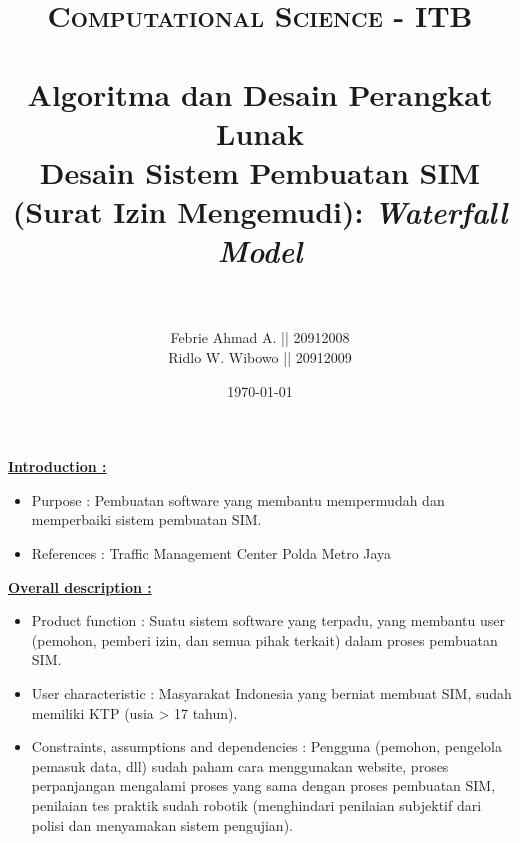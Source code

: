 \documentclass[paper=a4, fontsize=11pt]{scrartcl}
\title{	
\normalfont \normalsize 
\textsc{Computational Science - ITB} \\ [25pt] %
\horrule{0.5pt} \\[0.4cm] %
\small Algoritma dan Desain Perangkat Lunak \\ 
\large Desain Sistem Pembuatan SIM (Surat Izin Mengemudi): \textit{Waterfall Model}\\  %
\horrule{1.5pt} \\[0.5cm] %
}
\author{\small Febrie Ahmad A. || 20912008 \\ \small Ridlo W. Wibowo || 20912009} %
\date{\normalsize\today} %
\numberwithin{equation}{section} %
\numberwithin{figure}{section} %
\numberwithin{table}{section} %
\begin{document}
\maketitle %
\underline{\textbf{Introduction :}}
\begin{itemize}
	\item Purpose : Pembuatan software yang membantu mempermudah dan memperbaiki sistem pembuatan SIM.
	\item References : Traffic Management Center Polda Metro Jaya
\end{itemize}

\underline{\textbf{Overall description :}}
\begin{itemize}
	\item Product function : Suatu sistem software yang terpadu, yang membantu user (pemohon, pemberi izin, dan semua pihak terkait) dalam proses pembuatan SIM.
	\item User characteristic : Masyarakat Indonesia yang berniat membuat SIM, sudah memiliki KTP (usia > 17 tahun).
	\item Constraints, assumptions and dependencies : Pengguna (pemohon, pengelola pemasuk data, dll) sudah paham cara menggunakan website, proses perpanjangan mengalami proses yang sama dengan proses pembuatan SIM, penilaian tes praktik sudah robotik (menghindari penilaian subjektif dari polisi dan menyamakan sistem pengujian).
\end{itemize}
\end{document}
